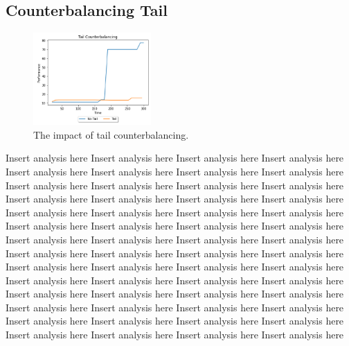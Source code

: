 \documentclass{article}
\begin{document}
\subsection{Counterbalancing Tail}
\begin{figure}
    \centering
    \vspace*{-5mm}
    \includegraphics[width=0.4\textwidth]{tailResults}
    \vspace*{-7mm}
    \caption{The impact of tail counterbalancing.}
\end{figure}
Insert analysis here Insert analysis here Insert analysis here Insert analysis here Insert analysis here Insert analysis here Insert analysis here Insert analysis here Insert analysis here Insert analysis here Insert analysis here Insert analysis here Insert analysis here Insert analysis here Insert analysis here Insert analysis here Insert analysis here Insert analysis here Insert analysis here Insert analysis here Insert analysis here Insert analysis here Insert analysis here Insert analysis here Insert analysis here Insert analysis here Insert analysis here Insert analysis here Insert analysis here Insert analysis here Insert analysis here Insert analysis here Insert analysis here Insert analysis here Insert analysis here Insert analysis here Insert analysis here Insert analysis here Insert analysis here Insert analysis here Insert analysis here Insert analysis here Insert analysis here Insert analysis here Insert analysis here Insert analysis here Insert analysis here Insert analysis here Insert analysis here Insert analysis here Insert analysis here Insert analysis here Insert analysis here Insert analysis here Insert analysis here Insert analysis here
\end{document}
